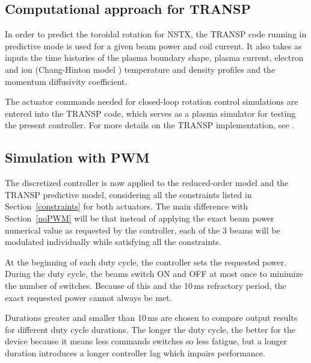 \documentclass{iopart}
\begin{document}
\subsection{Computational approach for TRANSP}
In order to predict the toroidal rotation for NSTX, the TRANSP code running in predictive mode is used for a given beam power and coil current. It also takes as inputs the time histories of the plasma boundary shape, plasma current, electron and ion (Chang-Hinton model \cite{Changhinton}) temperature and density profiles and the momentum diffusivity coefficient.

The actuator commands needed for closed-loop rotation control simulations are entered into the TRANSP code, which serves as a plasma simulator for testing the present controller. For more details on the TRANSP implementation, see \cite{Boyer15}.

\subsection{Simulation with PWM}
The discretized controller is now applied to the reduced-order model and the TRANSP predictive model, considering all the constraints listed in Section~\ref{constraints} for both actuators. The main difference with Section~\ref{noPWM} will be that instead of applying the exact beam power numerical value as requested by the controller, each of the 3 beams will be modulated individually while satisfying all the constraints.

At the beginning of each duty cycle, the controller sets the requested power. During the duty cycle, the beams switch ON and OFF at most once to minimize the number of switches. Because of this and the 10\,ms refractory period, the exact requested power cannot always be met.

Durations greater and smaller than 10\,ms are chosen to compare output results for different duty cycle durations. The longer the duty cycle, the better for the device because it means less commands switches so less fatigue, but a longer duration introduces a longer controller lag which impairs performance.
  
\end{document}

